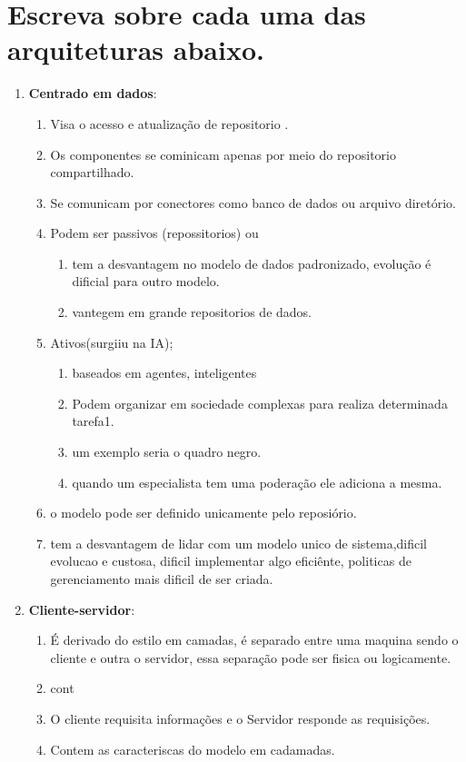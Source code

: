 \documentclass[12pt]{article}
\begin{document}
\section{Escreva sobre cada uma das arquiteturas abaixo.}
\begin{enumerate}
\item \textbf{Centrado em dados}:
\begin{enumerate}
	\item Visa o acesso e atualização de repositorio  .
	\item Os componentes se cominicam apenas por meio do repositorio compartilhado.
	\item Se comunicam por conectores como banco de dados ou arquivo diretório.
	\item Podem ser passivos (repossitorios) ou
	\begin{enumerate}
		\item tem a desvantagem  no modelo de dados padronizado, evolução é dificial para outro modelo.
		\item vantegem em grande repositorios de dados.
	\end{enumerate}
	\item Ativos(surgiiu na IA);
		\begin{enumerate}
		\item baseados em agentes, inteligentes 
		\item Podem organizar em sociedade complexas para realiza determinada tarefa1.
		\item um exemplo seria o quadro negro.
		\item quando um especialista tem uma poderação ele adiciona a mesma.
	\end{enumerate}
	\item o modelo pode ser definido unicamente pelo reposiório.
	\item tem a desvantagem de lidar com um modelo unico de sistema,dificil evolucao e custosa, dificil implementar algo eficiênte, politicas de gerenciamento mais dificil de ser criada.
	
\end{enumerate}

\item \textbf{Cliente-servidor}:
\begin{enumerate}
	\item É derivado do estilo em camadas, é separado entre uma maquina sendo o cliente e outra o servidor, essa separação pode ser fisica ou logicamente.
	\item cont
	\item O cliente requisita informações e o Servidor responde as requisições.
	\item Contem as caracteriscas do modelo em cadamadas.
\end{enumerate}


\end{enumerate}
\end{document}
